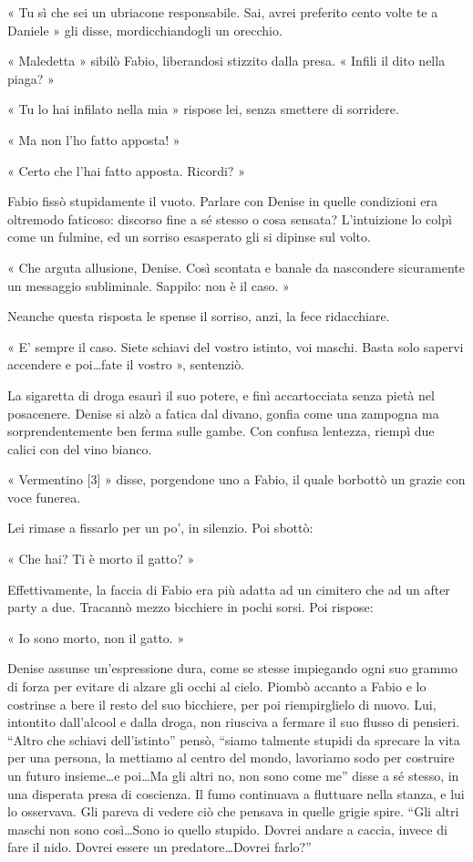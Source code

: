 « Tu sì che sei un ubriacone responsabile. Sai, avrei preferito cento volte te a Daniele » gli disse, mordicchiandogli un orecchio.

« Maledetta » sibilò Fabio, liberandosi stizzito dalla presa. « Infili il dito nella piaga? »

« Tu lo hai infilato nella mia » rispose lei, senza smettere di sorridere.

« Ma non l'ho fatto apposta! »

« Certo che l'hai fatto apposta. Ricordi? »

Fabio fissò stupidamente il vuoto. Parlare con Denise in quelle condizioni era oltremodo faticoso: discorso fine a sé stesso o cosa sensata? L'intuizione lo colpì come un fulmine, ed un sorriso esasperato gli si dipinse sul volto.

« Che arguta allusione, Denise. Così scontata e banale da nascondere sicuramente un messaggio subliminale. Sappilo: non è il caso. »

Neanche questa risposta le spense il sorriso, anzi, la fece ridacchiare.

« E' sempre il caso. Siete schiavi del vostro istinto, voi maschi. Basta solo sapervi accendere e poi\ldots fate il vostro », sentenziò.

La sigaretta di droga esaurì il suo potere, e finì accartocciata senza pietà nel posacenere. Denise si alzò a fatica dal divano, gonfia come una zampogna ma sorprendentemente ben ferma sulle gambe. Con confusa lentezza, riempì due calici con del vino bianco.

« Vermentino [3] » disse, porgendone uno a Fabio, il quale borbottò un grazie con voce funerea.

Lei rimase a fissarlo per un po', in silenzio. Poi sbottò:

« Che hai? Ti è morto il gatto? »

Effettivamente, la faccia di Fabio era più adatta ad un cimitero che ad un after party a due. Tracannò mezzo bicchiere in pochi sorsi. Poi rispose:

« Io sono morto, non il gatto. »

Denise assunse un'espressione dura, come se stesse impiegando ogni suo grammo di forza per evitare di alzare gli occhi al cielo. Piombò accanto a Fabio e lo costrinse a bere il resto del suo bicchiere, per poi riempirglielo di nuovo. Lui, intontito dall'alcool e dalla droga, non riusciva a fermare il suo flusso di pensieri. ``Altro che schiavi dell'istinto'' pensò, ``siamo talmente stupidi da sprecare la vita per una persona, la mettiamo al centro del mondo, lavoriamo sodo per costruire un futuro insieme\ldots e poi\ldots Ma gli altri no, non sono come me'' disse a sé stesso, in una disperata presa di coscienza. Il fumo continuava a fluttuare nella stanza, e lui lo osservava. Gli pareva di vedere ciò che pensava in quelle grigie spire. ``Gli altri maschi non sono così\ldots Sono io quello stupido. Dovrei andare a caccia, invece di fare il nido. Dovrei essere un predatore\ldots Dovrei farlo?''

